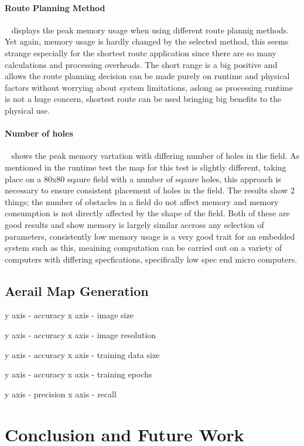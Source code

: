 \documentclass[final]{cmpreport_02}
\begin{document}
\paragraph{Route Planning Method} \
 displays the peak memory usage when using different route plannig methods. Yet again, memory usage is hardly changed by the selected method, this seems strange especially for the shortest route application since there are so many calculations and processing overheads.
The short range is a big positive and allows the route planning decision can be made purely on runtime and physical factors without worrying about system limitations, aslong as processing runtime is not a huge concern, shortest route can be used bringing big benefits to the physical use.



\paragraph{Number of holes} \
 shows the peak memory vartation with differing number of holes in the field.
As mentioned in the runtime test the map for this test is slightly different, taking place on a 80x80 sqaure field with a number of sqaure holes, this approach is necessary to ensure consistent placement of holes in the field.
The results show 2 things; the number of obstacles in a field do not affect memory and memory consumption is not directly affected by the shape of the field.
Both of these are good results and show memory is largely similar accross any selection of parameters, consistently low memory usage is a very good trait for an embedded system such as this, meaining computation can be carried out on a variety of computers with differing specfications, specifically low spec end micro computers.

\subsection{Aerail Map Generation}

y axis - accuracy
x axis - image size

y axis - accuracy
x axis - image resolution

y axis - accuracy
x axis - training data size

y axis - accuracy
x axis - training epochs

y axis - precision
x axis - recall


\section{Conclusion and Future Work}
\end{document}
